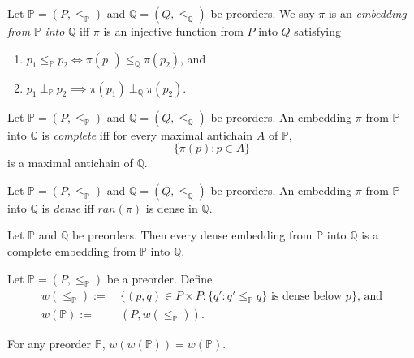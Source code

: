 \documentclass[12pt]{article}
\numberwithin{equation}{section}
\begin{document}
\begin{defi}
Let $\mathbb{P} = (P, \leq_{\mathbb{P}})$ and $\mathbb{Q} = (Q, \leq_{\mathbb{Q}})$ be preorders. We say $\pi$ is an \emph{embedding from} $\mathbb{P}$ \emph{into} $\mathbb{Q}$ iff $\pi$ is an injective function from $P$ into $Q$ satisfying
\begin{enumerate}[label=(\alph*)]
    \item $p_1 \leq_{\mathbb{P}} p_2 \iff \pi(p_1) \leq_{\mathbb{Q}} \pi(p_2)$, and
    \item $p_1 \ \bot_{\mathbb{P}} \ p_2 \implies \pi(p_1) \ \bot_{\mathbb{Q}} \ \pi(p_2)$.
\end{enumerate}
\end{defi}

\begin{defi}
Let $\mathbb{P} = (P, \leq_{\mathbb{P}})$ and $\mathbb{Q} = (Q, \leq_{\mathbb{Q}})$ be preorders. An embedding $\pi$ from $\mathbb{P}$ into $\mathbb{Q}$ is \emph{complete} iff for every maximal antichain $A$ of $\mathbb{P}$, $$\{\pi(p) : p \in A\}$$ is a maximal antichain of $\mathbb{Q}$.
\end{defi}

\begin{defi}
Let $\mathbb{P} = (P, \leq_{\mathbb{P}})$ and $\mathbb{Q} = (Q, \leq_{\mathbb{Q}})$ be preorders. An embedding $\pi$ from $\mathbb{P}$ into $\mathbb{Q}$ is \emph{dense} iff $ran(\pi)$ is dense in $\mathbb{Q}$.
\end{defi}

\begin{fact}\label{dic}
Let $\mathbb{P}$ and $\mathbb{Q}$ be preorders. Then every dense embedding from $\mathbb{P}$ into $\mathbb{Q}$ is a complete embedding from $\mathbb{P}$ into $\mathbb{Q}$.
\end{fact}

\begin{defi}
Let $\mathbb{P} = (P, \leq_{\mathbb{P}})$ be a preorder. Define \begin{align*}
    w(\leq_{\mathbb{P}}) := \ & \{(p, q) \in P \times P : \{q' : q' \leq_{\mathbb{P}} q\} \text{ is dense below } p\} \text{, and} \\
    w(\mathbb{P}) := \ & (P, w(\leq_{\mathbb{P}})) \text{.}
\end{align*}
\end{defi}

\begin{fact}\label{wfixedp}
For any preorder $\mathbb{P}$, $w(w(\mathbb{P})) = w(\mathbb{P})$.
\end{fact}
\end{document}
